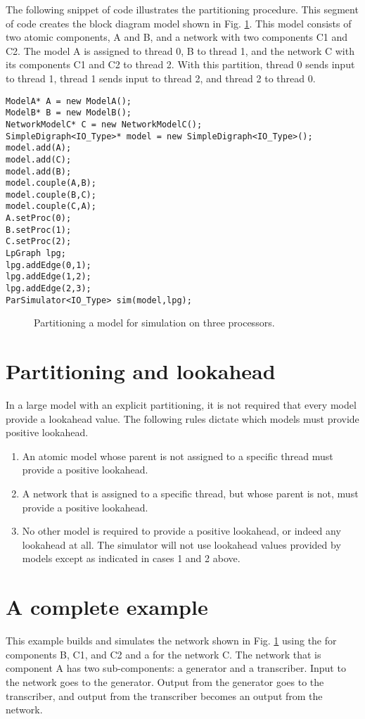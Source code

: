 The following snippet of code illustrates the partitioning procedure. This segment of code creates the block diagram model shown in Fig. \ref{fig:partition_example}. This model consists of two atomic components, A and B, and a network with two components C1 and C2. The model A is assigned to thread 0, B to thread 1, and the network C with its components C1 and C2 to thread 2. With this partition, thread 0 sends input to thread 1, thread 1 sends input to thread 2, and thread 2 to thread 0. 
\begin{verbatim}
ModelA* A = new ModelA();
ModelB* B = new ModelB();
NetworkModelC* C = new NetworkModelC();
SimpleDigraph<IO_Type>* model = new SimpleDigraph<IO_Type>();
model.add(A);
model.add(C);
model.add(B);
model.couple(A,B);
model.couple(B,C);
model.couple(C,A);
A.setProc(0);
B.setProc(1);
C.setProc(2);
LpGraph lpg;
lpg.addEdge(0,1);
lpg.addEdge(1,2);
lpg.addEdge(2,3);
ParSimulator<IO_Type> sim(model,lpg);
\end{verbatim}
\begin{figure}[ht]
\centering
{}
\caption{Partitioning a model for simulation on three processors.}
\label{fig:partition_example}
\end{figure}

\section{Partitioning and lookahead}
In a large model with an explicit partitioning, it is not required that every model provide a lookahead value. The following rules dictate which models must provide positive lookahead.
\begin{enumerate}
\item An atomic model whose parent is not assigned to a specific thread must provide a positive lookahead.
\item A network that is assigned to a specific thread, but whose parent is not, must provide a positive lookahead. 
\item No other model is required to provide a positive lookahead, or indeed any lookahead at all. The simulator will not use lookahead values provided by models except as indicated in cases 1 and 2 above.
\end{enumerate}

\section{A complete example}
This example builds and simulates the network shown in Fig. \ref{fig:partition_example} using the  for components B, C1, and C2 and a  for the network C. The network that is component A has two sub-components: a generator and a transcriber. Input to the network goes to the generator. Output from the generator goes to the transcriber, and output from the transcriber becomes an output from the network. 


